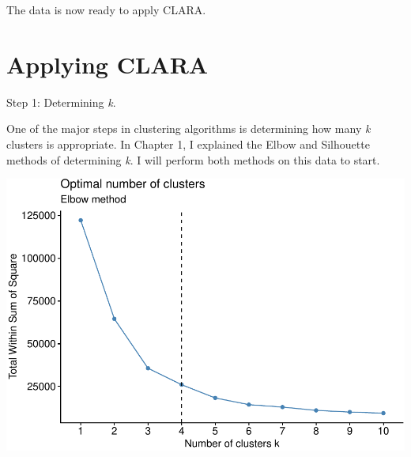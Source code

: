 \documentclass[12pt,twoside]{amherstthesis}
\begin{document}
  The data is now ready to apply CLARA.
  
  \section{Applying CLARA}\label{applying-clara}
  
  Step 1: Determining \emph{k}.
  
  One of the major steps in clustering algorithms is determining how many
  \emph{k} clusters is appropriate. In Chapter 1, I explained the Elbow
  and Silhouette methods of determining \emph{k}. I will perform both
  methods on this data to start.
  
  \begin{Shaded}
  \begin{Highlighting}[]
  \StringTok{ }
  
  \StringTok{ } \NormalTok{) }\OperatorTok{+}
  \StringTok{    }\NormalTok{(} \NormalTok{, } \NormalTok{)}\OperatorTok{+}
  \StringTok{  }\NormalTok{(} 
  \end{Highlighting}
  \end{Shaded}
  
  \begin{center}\includegraphics{Comps_Proj_files/figure-latex/unnamed-chunk-5-1} \end{center}
  
\end{document}
